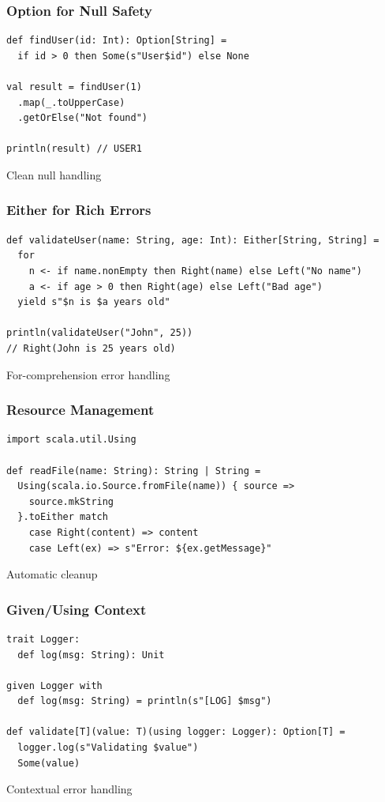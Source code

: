 \documentclass{beamer}
\begin{document}
\begin{frame}[fragile]
\frametitle{Option for Null Safety}

\begin{lstlisting}[style=scalaStyle]
def findUser(id: Int): Option[String] = 
  if id > 0 then Some(s"User$id") else None

val result = findUser(1)
  .map(_.toUpperCase)
  .getOrElse("Not found")

println(result) // USER1
\end{lstlisting}

Clean null handling

\end{frame}

\begin{frame}[fragile]
\frametitle{Either for Rich Errors}

\begin{lstlisting}[style=scalaStyle]
def validateUser(name: String, age: Int): Either[String, String] = 
  for
    n <- if name.nonEmpty then Right(name) else Left("No name")
    a <- if age > 0 then Right(age) else Left("Bad age")
  yield s"$n is $a years old"

println(validateUser("John", 25))
// Right(John is 25 years old)
\end{lstlisting}

For-comprehension error handling

\end{frame}

\begin{frame}[fragile]
\frametitle{Resource Management}

\begin{lstlisting}[style=scalaStyle]
import scala.util.Using

def readFile(name: String): String | String = 
  Using(scala.io.Source.fromFile(name)) { source =>
    source.mkString
  }.toEither match
    case Right(content) => content
    case Left(ex) => s"Error: ${ex.getMessage}"
\end{lstlisting}

Automatic cleanup

\end{frame}

\begin{frame}[fragile]
\frametitle{Given/Using Context}

\begin{lstlisting}[style=scalaStyle]
trait Logger:
  def log(msg: String): Unit

given Logger with
  def log(msg: String) = println(s"[LOG] $msg")

def validate[T](value: T)(using logger: Logger): Option[T] =
  logger.log(s"Validating $value")
  Some(value)
\end{lstlisting}

Contextual error handling

\end{frame}
\end{document}
